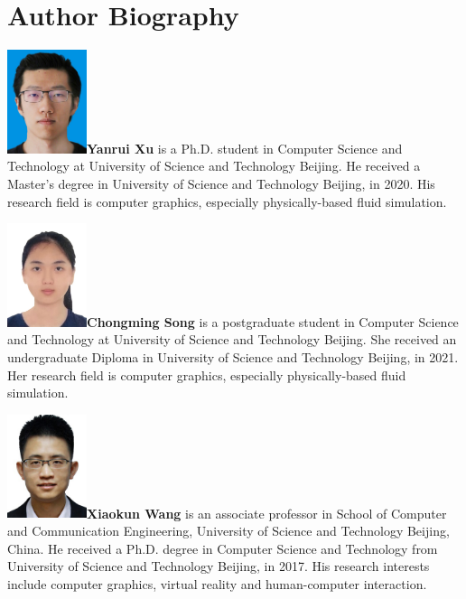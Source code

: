 \documentclass[VANCOUVER,STIX1COL]{WileyNJD-v2}
\begin{document}
\nocite{*}%


\section*{Author Biography}

\begin{biography}{\includegraphics[width=66pt,height=86pt]{VANCOUVER/figure/photos/YanruiXu.jpg}}{\textbf{Yanrui Xu} is a Ph.D. student in Computer Science and Technology at University of Science and Technology Beijing. He received a Master's degree in University of Science and Technology Beijing, in 2020. His research field is computer graphics, especially physically-based fluid simulation.}
\end{biography}

\vspace{7ex}

\begin{biography}{\includegraphics[width=66pt,height=86pt]{VANCOUVER/figure/photos/ChongmingSong.JPG}}{\textbf{Chongming Song} is a postgraduate student in Computer Science and Technology at University of Science and Technology Beijing. She received an undergraduate Diploma in University of Science and Technology Beijing, in 2021. Her research field is computer graphics, especially physically-based fluid simulation.}
\end{biography}

\vspace{7ex}

\begin{biography}{\includegraphics[width=66pt,height=86pt]{VANCOUVER/figure/photos/XiaokunWang.jpg}}{\textbf{Xiaokun Wang} is an associate professor in School of Computer and Communication Engineering, University of Science and Technology Beijing, China. He received a Ph.D. degree in Computer Science and Technology from University of Science and Technology Beijing, in 2017. His research interests include computer graphics, virtual reality and human-computer interaction.}
\end{biography}
\end{document}
